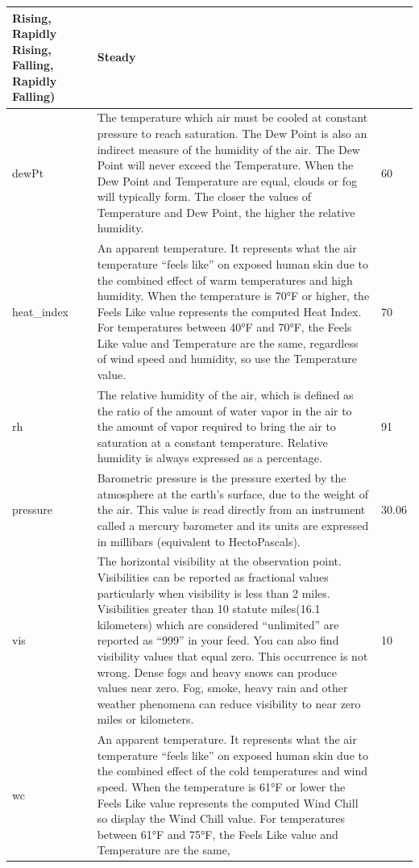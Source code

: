 \documentclass[paper=a4, fontsize=11pt, margin=1in]{scrartcl}
\numberwithin{equation}{section}		%
\numberwithin{figure}{section}			%
\numberwithin{table}{section}				%
\begin{document}
\begin{longtable}{|p{4.5cm}|p{7cm} |p{3cm}|}
Rising, 
Rapidly Rising, 
Falling, Rapidly Falling) & Steady \\ 
\hline
dewPt & The temperature which air must be cooled at constant pressure to reach saturation. The Dew Point is 
also an indirect measure of the humidity of the air. The Dew Point will never exceed the Temperature. 
When the Dew Point and Temperature are equal, clouds or fog will typically form. The closer the values 
of Temperature and Dew Point, the higher the relative humidity. & 60 \\
\hline
heat\_index & An apparent temperature. It represents what the air temperature “feels like” on exposed human skin 
due to the combined effect of warm temperatures and high humidity. 
When the temperature is 70°F or higher, the Feels Like value represents the computed Heat Index. 
For temperatures between 40°F and 70°F, the Feels Like value and Temperature are the same, 
regardless of wind speed and humidity, so use the Temperature value. & 70 \\
\hline
rh & The relative humidity of the air, which is defined as the ratio of the amount of water vapor in the air to 
the amount of vapor required to bring the air to saturation at a constant temperature. Relative humidity 
is always expressed as a percentage. & 91\\
\hline
pressure & Barometric pressure is the pressure exerted by the atmosphere at the earth's surface, due to the weight 
of the air. This value is read directly from an instrument called a mercury barometer and its units are 
expressed in millibars (equivalent to HectoPascals). & 30.06 \\
\hline
vis & The horizontal visibility at the observation point. Visibilities can be reported as fractional values 
particularly when visibility is less than 2 miles. Visibilities greater than 10 statute miles(16.1 kilometers) 
which are considered “unlimited” are reported as “999” in your feed. You can also find visibility values 
that equal zero. This occurrence is not wrong. Dense fogs and heavy snows can produce values near 
zero. Fog, smoke, heavy rain and other weather phenomena can reduce visibility to near zero miles or 
kilometers. & 10 \\
\hline
wc & An apparent temperature. It represents what the air temperature “feels like” on exposed human skin 
due to the combined effect of the cold temperatures and wind speed. 
When the temperature is 61°F or lower the Feels Like value represents the computed Wind Chill so 
display the Wind Chill value. 
For temperatures between 61°F and 75°F, the Feels Like value and Temperature are the same, 

\end{longtable}
\end{document}
